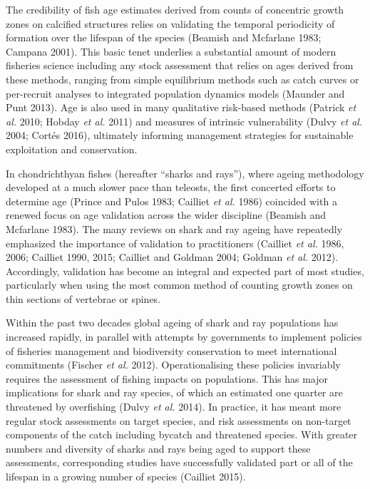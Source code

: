 \documentclass[]{article}
\begin{document}
The credibility of fish age estimates derived from counts of concentric
growth zones on calcified structures relies on validating the temporal
periodicity of formation over the lifespan of the species (Beamish and
Mcfarlane 1983; Campana 2001). This basic tenet underlies a substantial
amount of modern fisheries science including any stock assessment that
relies on ages derived from these methods, ranging from simple
equilibrium methods such as catch curves or per-recruit analyses to
integrated population dynamics models (Maunder and Punt 2013). Age is
also used in many qualitative risk-based methods (Patrick \emph{et al.}
2010; Hobday \emph{et al.} 2011) and measures of intrinsic vulnerability
(Dulvy \emph{et al.} 2004; Cortés 2016), ultimately informing management
strategies for sustainable exploitation and conservation.

In chondrichthyan fishes (hereafter ``sharks and rays''), where ageing
methodology developed at a much slower pace than teleosts, the first
concerted efforts to determine age (Prince and Pulos 1983; Cailliet
\emph{et al.} 1986) coincided with a renewed focus on age validation
across the wider discipline (Beamish and Mcfarlane 1983). The many
reviews on shark and ray ageing have repeatedly emphasized the
importance of validation to practitioners (Cailliet \emph{et al.} 1986,
2006; Cailliet 1990, 2015; Cailliet and Goldman 2004; Goldman \emph{et
al.} 2012). Accordingly, validation has become an integral and expected
part of most studies, particularly when using the most common method of
counting growth zones on thin sections of vertebrae or spines.

Within the past two decades global ageing of shark and ray populations
has increased rapidly, in parallel with attempts by governments to
implement policies of fisheries management and biodiversity conservation
to meet international commitments (Fischer \emph{et al.} 2012).
Operationalising these policies invariably requires the assessment of
fishing impacts on populations. This has major implications for shark
and ray species, of which an estimated one quarter are threatened by
overfishing (Dulvy \emph{et al.} 2014). In practice, it has meant more
regular stock assessments on target species, and risk assessments on
non-target components of the catch including bycatch and threatened
species. With greater numbers and diversity of sharks and rays being
aged to support these assessments, corresponding studies have
successfully validated part or all of the lifespan in a growing number
of species (Cailliet 2015).
\end{document}
